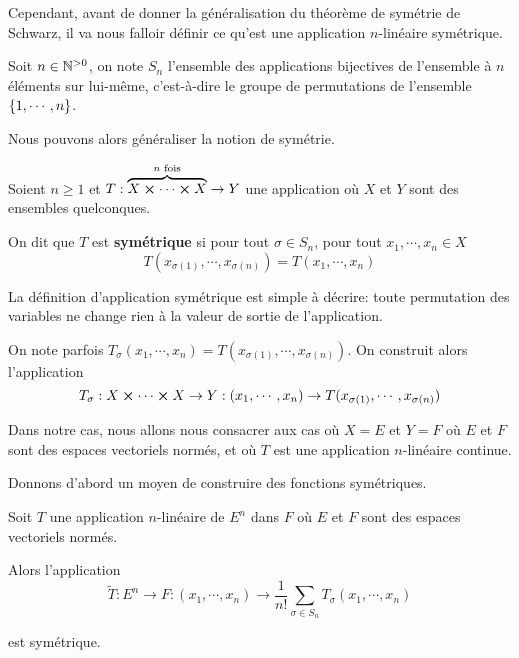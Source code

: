 Cependant, avant de donner la généralisation du théorème de symétrie de Schwarz,
il va nous falloir définir ce qu'est une application $n$-linéaire symétrique.

\begin{definition}
	Soit $n \in \mathbb{N}^{> 0}$, on note $S_{n}$ l'ensemble des applications
	bijectives de l'ensemble à $n$ éléments sur lui-même, c'est-à-dire le groupe
	de permutations de l'ensemble $\left\{ 1, \cdots, n \right\}$.
\end{definition}

Nous pouvons alors généraliser la notion de symétrie.

\begin{definition} 
	Soient $n \geq 1$ et $T : \overbrace{X \cross \cdots \cross X}^{n
	\text{ fois}} \rightarrow Y$ une application où $X$ et $Y$ sont des
	ensembles quelconques.

	On dit que $T$ est \textbf{symétrique} si
	pour tout $\sigma \in S_{n}$, pour tout $x_{1}, \cdots, x_{n} \in X$
	\begin{equation*}
		T(x_{\sigma(1)}, \cdots, x_{\sigma(n)}) = T(x_{1}, \cdots, x_{n})
	\end{equation*}
\end{definition}

La définition d'application symétrique est simple à décrire: toute permutation
des variables ne change rien à la valeur de sortie de l'application.

\begin{remarque}
	On note parfois $T_{\sigma} (x_{1}, \cdots, x_{n}) = T(x_{\sigma(1)},
	\cdots, x_{\sigma(n)})$. On construit alors l'application
	\begin{equation*}
		T_{\sigma} : X \cross \cdots \cross X \rightarrow Y : (x_{1},
		\cdots, x_{n}) \rightarrow T(x_{\sigma(1)}, \cdots, x_{\sigma(n)})
	\end{equation*}
\end{remarque}

Dans notre cas, nous allons nous consacrer aux cas où $X = E$ et $Y = F$ où $E$
et $F$ sont des espaces vectoriels normés, et où $T$ est une application $n$-linéaire continue.

Donnons d'abord un moyen de construire des fonctions symétriques.

\begin{proposition}
	Soit $T$ une application $n$-linéaire de $E^{n}$
	dans $F$ où $E$ et $F$ sont des espaces vectoriels normés.

	Alors l'application
	\begin{equation*}
		\tilde{T} : E^{n} \rightarrow F : (x_{1},
		\cdots, x_{n}) \rightarrow \frac{1}{n !} \sum_{\sigma \in S_{n}}
		T_{\sigma} (x_{1}, \cdots, x_{n})
	\end{equation*}

	est symétrique.
\end{proposition}

